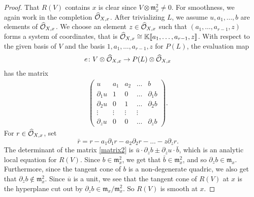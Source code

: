 \begin{proof}
  That $R(V)$ contains $x$ is clear since $V \otimes \mathfrak{m}^{2}_{x} \neq 0$.
  For smoothness, we again work in the completion $\widehat{\mathcal O}_{X,x}$.
  After trivializing $L$, we assume $u, a_{1}, ..., b$ are elements of $\widehat{\mathcal O}_{X,x}$.
  We choose an element $z \in \widehat{\mathcal O}_{X,x}$ such that $(a_1, \dots, a_{r-1}, z)$ forms a system of coordinates, that is $\widehat{\mathcal O}_{X,x} \cong \mathbb{K}\llbracket a_{1}, \dots , a_{r-1}, z \rrbracket$.
  With respect to the given basis of $V$ and the basis $1, a_1, \dots, a_{r-1}, z$ for $P(L)$, the evaluation map
  \begin{align*}
  e{\colon} V \otimes \widehat{\mathcal O}_{X,x} \to P(L) \otimes \widehat{\mathcal O}_{X,x}
  \end{align*}
  has the matrix
\begin{align}\label{matrix2}
\begin{pmatrix}
  u & a_{1} & a_{2} & \dots & b \\
  \partial_{1}u & 1 & 0 & \dots & \partial_{1}b \\
  \partial_{2}u & 0 & 1 & \dots & \partial_{2}b \\
  \vdots & \vdots & \vdots & \vdots \\
  \partial_{z}u  & 0 & 0 & \dots & \partial_{z}b
\end{pmatrix}.
\end{align}
For $r \in \widehat{\mathcal O}_{X,x}$, set
\[\bar{r} = r - a_{1}\partial_{1}r - a_{2}\partial_{2}r - \dots - z \partial_{z} r.\]
The determinant of the matrix \eqref{matrix2} is $\bar{u} \cdot \partial_{z}b \pm \partial_{z}u \cdot \bar{b}$, which is an analytic local equation for $R(V)$.
 Since $b \in {\mathfrak m}^{2}_{x}$, we get that $\bar{b} \in {\mathfrak m}^{2}_{x}$, and so $\partial_{z}b \in {\mathfrak m}_{x}$.
 Furthermore, since the tangent cone of $b$ is a non-degenerate quadric, we also get that $\partial_z b \not \in \mathfrak m_x^2$.
 Since $\overline{u}$ is a unit, we see that the tangent cone of $R(V)$ at $x$ is the hyperplane cut out by $\partial_z b \in \mathfrak m_x/\mathfrak m_x^2$.
 So $R(V)$ is smooth at $x$.
\end{proof}

